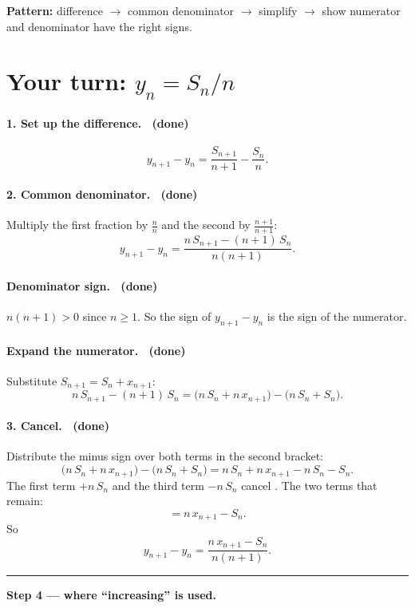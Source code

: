 \documentclass[11pt]{article}
\begin{document}
\noindent\textbf{Pattern:} difference $\to$ common denominator $\to$
simplify $\to$ show numerator and denominator have the right signs.

\newpage
\section*{Your turn: $y_n = S_n/n$}

\paragraph{1. Set up the difference. \checkmark\ (done)}
\[
  y_{n+1}-y_n = \frac{S_{n+1}}{n+1} - \frac{S_n}{n} .
\]

\paragraph{2. Common denominator. \checkmark\ (done)} Multiply the first
fraction by $\frac{n}{n}$ and the second by $\frac{n+1}{n+1}$:
\[
  y_{n+1}-y_n = \frac{n\,S_{n+1} - (n+1)\,S_n}{n(n+1)} .
\]

\paragraph{Denominator sign. \checkmark\ (done)} $n(n+1)>0$ since
$n\ge 1$. So the sign of $y_{n+1}-y_n$ is the sign of the numerator.

\paragraph{Expand the numerator. \checkmark\ (done)} Substitute
$S_{n+1} = S_n + x_{n+1}$:
\[
  n\,S_{n+1} - (n+1)\,S_n
  = \bigl(n\,S_n + n\,x_{n+1}\bigr) - \bigl(n\,S_n + S_n\bigr).
\]

\paragraph{3. Cancel. \checkmark\ (done)} Distribute the minus
sign over both terms in the second bracket:
\[
  \bigl(n\,S_n + n\,x_{n+1}\bigr) - \bigl(n\,S_n + S_n\bigr)
  = n\,S_n + n\,x_{n+1} - n\,S_n - S_n .
\]
The first term $+n\,S_n$ and the third term $-n\,S_n$ cancel
\checkmark. The two terms that remain:
\[
  = n\,x_{n+1} - S_n .
\]
So
\[
  y_{n+1}-y_n = \frac{n\,x_{n+1} - S_n}{n(n+1)} .
\]

\bigskip
\hrule
\bigskip
\noindent\textbf{\large Step 4 --- where ``increasing'' is used.}
\end{document}
